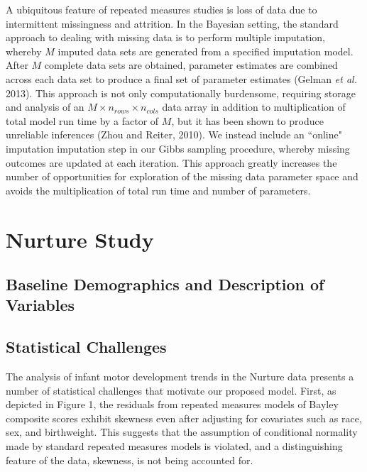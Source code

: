 \documentclass[useAMS,referee]{biom}
\begin{document}
A ubiquitous feature of repeated measures studies is loss of data due to intermittent missingness and attrition. In the Bayesian setting, the standard approach to dealing with missing data is to perform multiple imputation, whereby $M$ imputed data sets are generated from a specified imputation model. After $M$ complete data sets are obtained, parameter estimates are combined across each data set to produce a final set of parameter estimates (Gelman \textit{et al.} 2013). This approach is not only computationally burdensome, requiring storage and analysis of an $M \times n_{rows} \times n_{cols}$ data array in addition to multiplication of total model run time by a factor of $M$, but it has been shown to produce unreliable inferences (Zhou and Reiter, 2010). We instead include an ``online" imputation imputation step in our Gibbs sampling procedure, whereby missing outcomes are updated at each iteration. This approach greatly increases the number of opportunities for exploration of the missing data parameter space and avoids the multiplication of total run time and number of parameters.

\newpage

\section{Nurture Study}
\label{s:nurt}
\subsection{Baseline Demographics and Description of Variables}

\subsection{Statistical Challenges}

The analysis of infant motor development trends in the Nurture data presents a number of statistical challenges that motivate our proposed model. First, as depicted in Figure 1, the residuals from repeated measures models of Bayley composite scores exhibit skewness even after adjusting for covariates such as race, sex, and birthweight. This suggests that the assumption of conditional normality made by standard repeated measures models is violated, and a distinguishing feature of the data, skewness, is not being accounted for. 
\end{document}
